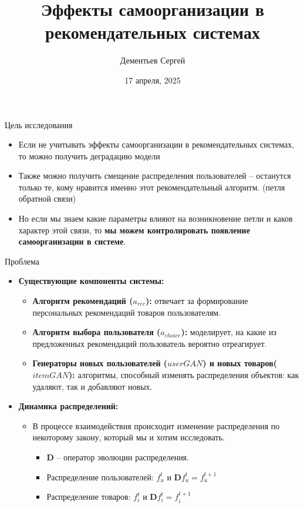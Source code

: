 \documentclass{beamer}
\title[Эффекты самоорганизации в рекомендательных системах]{Эффекты самоорганизации в рекомендательных системах}
\author{Дементьев Сергей}
\institute[МФТИ]{Московский физико-технический институт}
\date{17 апреля, 2025} %
\begin{document}
\begin{frame}
    \titlepage
\end{frame}

\begin{frame}{Цель исследования}
    \begin{itemize}
        \item Если не учитывать эффекты самоорганизации в рекомендательных системах, то можно получить деградацию модели
        \item Также можно получить смещение распределения пользователей – останутся только те, кому нравится именно этот рекомендательный алгоритм. (петля обратной связи)
        \item Но если мы знаем какие параметры влияют на возникновение петли и каков характер этой связи, то \textbf{мы можем контролировать появление самоорганизации в системе}.
    \end{itemize}
\end{frame}

\begin{frame}{Проблема}
  \begin{itemize}
    \item \textbf{Существующие компоненты системы:}
      \begin{itemize}
        \item \textbf{Алгоритм рекомендаций ($a_{rec}$):} отвечает за формирование персональных рекомендаций товаров пользователям.
        \item \textbf{Алгоритм выбора пользователя ($a_{choice}$):} моделирует, на какие из предложенных рекомендаций пользователь вероятно отреагирует.

        \item \textbf{Генераторы новых пользователей ($userGAN$) и новых товаров($itemGAN$):} алгоритмы, способный изменять распределения объектов: как удаляют, так и добавляют новых.
      \end{itemize}
    \item \textbf{Динамика распределений:}
      \begin{itemize}
        \item В процессе взаимодействия происходит изменение распределения по некоторому закону, который мы и хотим исследовать.
          \begin{itemize}
            \item $\mathbf{D}$ – оператор эволюции распределения. 
            
            \item Распределение пользователей: $f_u^t$ и  $\mathbf{D}f_u^t = f_u^{t+1}$
            \item Распределение товаров: $f_i^t$ и  $\mathbf{D}f_i^t = f_i^{t+1}$
          \end{itemize}
      \end{itemize}
  \end{itemize}
\end{frame}
\end{document}
